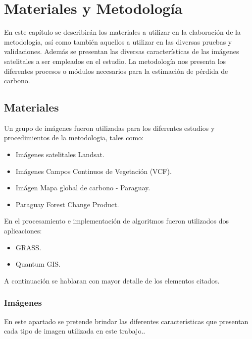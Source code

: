 \newpage{\ } 
\thispagestyle{empty} 

\chapter{Materiales y Metodolog\'ia}
En este cap\'itulo se describir\'an los materiales a utilizar en la elaboraci\'on de la metodolog\'ia, as\'i como tambi\'en aquellos a utilizar en las diversas pruebas y validaciones. Adem\'as se presentan las diversas caracter\'isticas de las im\'agenes satelitales a ser empleados en el estudio. La metodolog\'ia nos presenta los diferentes procesos o m\'odulos necesarios para la estimaci\'on de p\'erdida de carbono.
\section{Materiales}
Un grupo de im\'agenes fueron utilizadas para los diferentes estudios y procedimientos de la metodologia, tales como:
\begin{itemize}
	\item Im\'agenes satelitales Landsat.
	\item Im\'agenes Campos Continuos de Vegetaci\'on (VCF).
	\item Im\'agen Mapa global de carbono - Paraguay.
	\item Paraguay Forest Change Product.
\end{itemize}
En el procesamiento e implementaci\'on de algoritmos fueron utilizados dos aplicaciones:
\begin{itemize}
	\item GRASS.
	\item Quantum GIS.
\end{itemize}
A continuaci\'on se hablaran con mayor detalle de los elementos citados.
\subsection{Im\'agenes}
En este apartado se pretende brindar las diferentes caracter\'isticas que presentan cada tipo de imagen utilizada en este trabajo..
